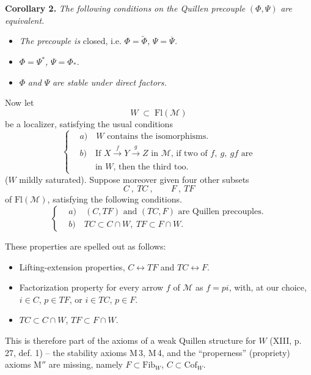 \documentclass[11pt]{article}
\newcommand{\printedpage}[1]{\marginpar{\footnotesize p.~#1}}
\newcommand{\msp}[1]{\marginpar{\footnotesize [#1]}}
\newcommand{\Fl}{\mathrm{Fl}}
\begin{document}
\textbf{Corollary 2.} \textit{The following conditions on the Quillen precouple} $(\Phi,\Psi)$ \textit{are equivalent.}
\begin{itemize}[leftmargin=2.5em]
\item[a)] \textit{The precouple is} closed, i.e. $\Phi=\widetilde{\Phi}$\textit{,} $\Psi=\overline{\Psi}$\textit{.}
\item[b)] $\Phi=\Psi^*$\textit{,} $\Psi=\Phi_*$\textit{.}
\item[c)] $\Phi$ \textit{and} $\Psi$ \textit{are stable under direct factors.}
\end{itemize}
Now let
\[
W \;\subset\; \Fl(\mathcal{M})
\tag*{(4.5)}
\]
be a localizer, satisfying the usual conditions
\[
\left\{
\begin{aligned}
&\textit{a})\quad W \text{ contains the isomorphisms.}\\[1ex]
&\textit{b})\quad \text{If } X\xrightarrow{\;f\;}Y\xrightarrow{\;g\;}Z \text{ in } \mathcal{M}\text{, if two of } f,\ g,\ gf \text{ are}\\
&\phantom{\textit{b})}\quad \text{in } W\text{, then the third too.}
\end{aligned}
\right.
\tag*{(4.6)}
\]
($W$ mildly saturated). Suppose moreover given four other subsets
\[
C\ ,\ TC\ , \qquad F\ ,\ TF
\tag*{(4.7)}
\]
of $\Fl(\mathcal{M})$, satisfying the following conditions.
\[
\left\{
\begin{aligned}
&\textit{a})\quad (C,TF) \text{ and } (TC,F) \text{ are Quillen precouples.}\\[1ex]
&\textit{b})\quad TC\subset C\cap W,\ TF\subset F\cap W.
\end{aligned}
\right.
\tag*{(4.8)}
\]

\msp{page 32}
These properties are spelled out as follows:
\begin{itemize}[leftmargin=2.5em]
\item[\textbf{M\,1}] Lifting-extension properties, $C\longleftrightarrow TF$ and $TC\longleftrightarrow F$.
\item[\textbf{M\,2}] Factorization property for every arrow $f$ of $\mathcal{M}$ as $f=pi$, with, at our choice, $i\in C$, $p\in TF$, or $i\in TC$, $p\in F$.
\item[\textbf{M$'$}] $TC\subset C\cap W$, $TF\subset F\cap W$.
\end{itemize}

\printedpage{22}
This is therefore part of the axioms of a weak Quillen structure for $W$ (XIII, p. 27, def. 1) -- the stability axioms M\,3, M\,4, and the ``properness'' (propriety) axioms M$''$ are missing, namely $F\subset\mathrm{Fib}_W$, $C\subset\mathrm{Cof}_W$.
\end{document}
